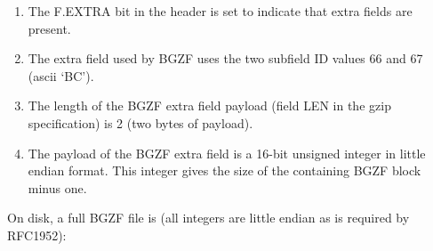 \documentclass[10pt]{article}
\begin{document}
\begin{enumerate}
\item The {\sf F.EXTRA} bit in the header is set to indicate that extra
  fields are present.
\item The extra field used by BGZF uses the two subfield ID values 66 and 67 (ascii `BC').
\item The length of the BGZF extra field payload (field {\sf LEN} in the
  gzip specification) is 2 (two bytes of payload).
\item The payload of the BGZF extra field is a 16-bit unsigned integer
  in little endian format. This integer gives the size of the containing
  BGZF block minus one.
\end{enumerate}

On disk, a full BGZF file is (all integers are little endian as is
required by RFC1952):
\end{document}
